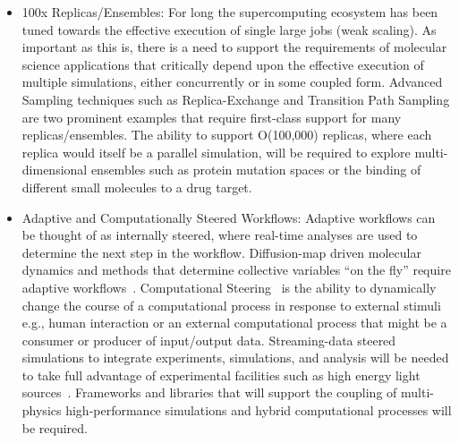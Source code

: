 \documentclass[10pt,letterpaper,draft]{article}
\begin{document}
\begin{itemize}
\item 100x Replicas/Ensembles: For long the supercomputing ecosystem has been tuned
  towards the effective execution of single large jobs (weak scaling). As
  important as this is, there is a need to support the requirements of molecular
  science applications that critically depend upon the effective execution of
  multiple simulations, either concurrently or in some coupled form. Advanced
  Sampling techniques such as Replica-Exchange and Transition Path Sampling are
  two prominent examples that require first-class support for many
  replicas/ensembles. The ability to support O(100,000) replicas, where each
  replica would itself be a parallel simulation, will be required to explore
  multi-dimensional ensembles such as protein mutation spaces or the binding of
  different small molecules to a drug target.

\item Adaptive and Computationally Steered Workflows: Adaptive workflows can be
  thought of as internally steered, where real-time analyses are used to
  determine the next step in the workflow. Diffusion-map driven molecular
  dynamics and methods that determine collective variables ``on the fly''
  require adaptive workflows~\cite{cecilia1}.  
  Computational Steering~\cite{comp-steer} is the ability to dynamically change
  the course of a computational process in response to external stimuli e.g.,
  human interaction or an external computational process that might be a
  consumer or producer of input/output data.  Streaming-data steered simulations
  to integrate experiments, simulations, and analysis will be needed to take
  full advantage of experimental facilities such as high energy light
  sources~\cite{jha1}.  Frameworks and libraries that will support the coupling
  of multi-physics high-performance simulations and hybrid computational
  processes will be required.

\end{itemize}
\end{document}
